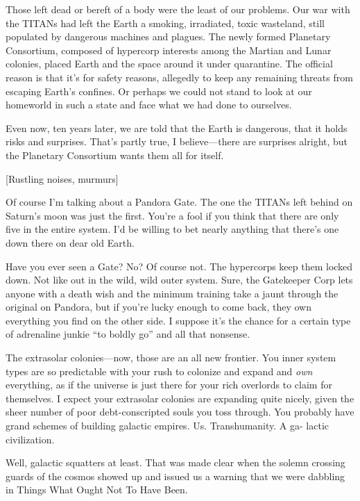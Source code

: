 Those left dead or bereft of a body were the least 
of our problems. Our war with the TITANs had left 
the Earth a smoking, irradiated, toxic wasteland, still 
populated by dangerous machines and plagues. The 
newly formed Planetary Consortium, composed of 
hypercorp interests among the Martian and Lunar 
colonies, placed Earth and the space around it under 
quarantine. The official reason is that it's for safety 
reasons, allegedly to keep any remaining threats from 
escaping Earth's confines. Or perhaps we could not 
stand to look at our homeworld in such a state and 
face what we had done to ourselves.

Even now, ten years later, we are told that the Earth 
is dangerous, that it holds risks and surprises. That's 
partly true, I believe—there are surprises alright, but 
the Planetary Consortium wants them all for itself.

[Rustling noises, murmurs]

Of course I'm talking about a Pandora Gate. The 
one the TITANs left behind on Saturn's moon was 
just the first. You're a fool if you think that there are 
only five in the entire system. I'd be willing to bet 
nearly anything that there's one down there on dear 
old Earth.

Have you ever seen a Gate? No? Of course not. 
The hypercorps keep them locked down. Not like out 
in the wild, wild outer system. Sure, the Gatekeeper 
Corp lets anyone with a death wish and the minimum 
training take a jaunt through the original on Pandora, 
but if you're lucky enough to come back, they own 
everything you find on the other side. I suppose it's 
the chance for a certain type of adrenaline junkie ``to 
boldly go'' and all that nonsense.

The extrasolar colonies—now, those are an all new 
frontier. You inner system types are so predictable 
with your rush to colonize and expand and \textit{own}
everything, as if the universe is just there for your 
rich overlords to claim for themselves. I expect your 
extrasolar colonies are expanding quite nicely, given 
the sheer number of poor debt-conscripted souls you 
toss through. You probably have grand schemes of 
building galactic empires. Us. Transhumanity. A ga-
lactic civilization.

Well, galactic squatters at least. That was made 
clear when the solemn crossing guards of the cosmos 
showed up and issued us a warning that we were 
dabbling in Things What Ought Not To Have Been. 

